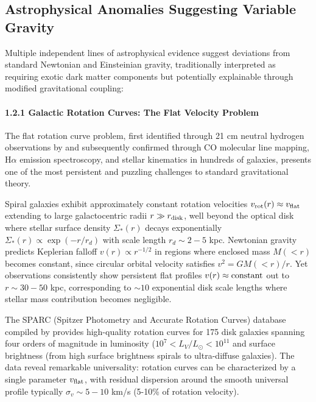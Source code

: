 \documentclass[11pt,a4paper]{article}
\begin{document}
\hypertarget{astrophysical-anomalies-suggesting-variable-gravity}{%
\subsection{Astrophysical Anomalies Suggesting Variable
Gravity}\label{astrophysical-anomalies-suggesting-variable-gravity}}

Multiple independent lines of astrophysical evidence suggest deviations
from standard Newtonian and Einsteinian gravity, traditionally
interpreted as requiring exotic dark matter components but potentially
explainable through modified gravitational coupling:

\hypertarget{galactic-rotation-curves-the-flat-velocity-problem}{%
\paragraph{1.2.1 Galactic Rotation Curves: The Flat Velocity
Problem}\label{galactic-rotation-curves-the-flat-velocity-problem}}

The flat rotation curve problem, first identified through 21 cm neutral
hydrogen observations by \cite{Rubin1970} and subsequently
confirmed through CO molecular line mapping, H$\alpha$ emission spectroscopy,
and stellar kinematics in hundreds of galaxies, presents one of the most
persistent and puzzling challenges to standard gravitational theory.

Spiral galaxies exhibit approximately constant rotation velocities
\(v_{\rm rot}(r) \approx v_{\rm flat}\) extending to large
galactocentric radii \(r \gg r_{\rm disk}\), well beyond the optical
disk where stellar surface density \(\Sigma_*(r)\) decays exponentially
\(\Sigma_*(r) \propto \exp(-r/r_d)\) with scale length \(r_d \sim 2-5\)
kpc. Newtonian gravity predicts Keplerian falloff
\(v(r) \propto r^{-1/2}\) in regions where enclosed mass \(M(<r)\)
becomes constant, since circular orbital velocity satisfies
\(v^2 = GM(<r)/r\). Yet observations consistently show persistent flat
profiles \(v(r) \approx {\rm constant}\) out to \(r \sim 30-50\) kpc,
corresponding to \(\sim 10\) exponential disk scale lengths where
stellar mass contribution becomes negligible.

The SPARC (Spitzer Photometry and Accurate Rotation Curves) database
compiled by \cite{Lelli2016} provides high-quality rotation curves
for 175 disk galaxies spanning four orders of magnitude in luminosity
(\(10^7 < L_V/L_\odot < 10^{11}\) and surface brightness (from high
surface brightness spirals to ultra-diffuse galaxies). The data reveal
remarkable universality: rotation curves can be characterized by a
single parameter \(v_{\rm flat}\), with residual dispersion around the
smooth universal profile typically \(\sigma_v \sim 5-10\) km/s (5-10\%
of rotation velocity).
\end{document}
